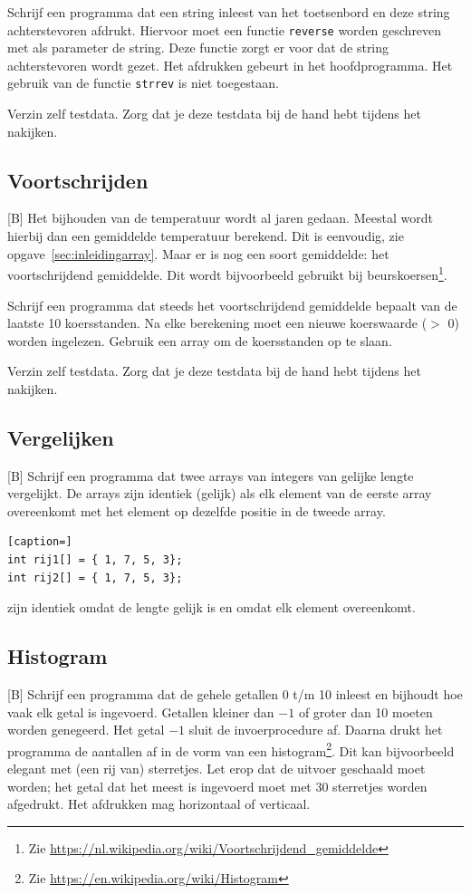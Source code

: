 \documentclass[a4paper,10pt,fleqn,twoside]{article}
\begin{document}
Schrijf een programma dat een string inleest van het toetsenbord en deze string achterstevoren afdrukt. Hiervoor moet een functie \lstinline|reverse| worden geschreven met als parameter de string. Deze functie zorgt er voor dat de string achterstevoren wordt gezet. Het afdrukken gebeurt in het hoofdprogramma. Het gebruik van de functie \lstinline|strrev| is niet toegestaan.

Verzin zelf testdata. Zorg dat je deze testdata bij de hand hebt tijdens het nakijken.

\subsection{Voortschrijden}[B]
Het bijhouden van de temperatuur wordt al jaren gedaan. Meestal wordt hierbij dan een gemiddelde temperatuur berekend. Dit is eenvoudig, zie opgave~\ref{sec:inleidingarray}. Maar er is nog een soort gemiddelde: het voortschrijdend gemiddelde. Dit wordt bijvoorbeeld gebruikt bij beurskoersen\footnote{Zie \url{https://nl.wikipedia.org/wiki/Voortschrijdend_gemiddelde}}.

Schrijf een programma dat steeds het voortschrijdend gemiddelde bepaalt van de laatste 10 koersstanden. Na elke berekening moet een nieuwe koerswaarde ($>$ 0) worden ingelezen. Gebruik een array om de koersstanden op te slaan.

Verzin zelf testdata. Zorg dat je deze testdata bij de hand hebt tijdens het nakijken.

\subsection{Vergelijken}[B]
Schrijf een programma dat twee arrays van integers van gelijke lengte vergelijkt. De arrays zijn identiek (gelijk) als elk element van de eerste array overeenkomt met het element op dezelfde positie in de tweede array.

\begin{lstlisting}[caption=]
int rij1[] = { 1, 7, 5, 3};
int rij2[] = { 1, 7, 5, 3};
\end{lstlisting}

zijn identiek omdat de lengte gelijk is en omdat elk element overeenkomt.

\subsection{Histogram}[B]
Schrijf een programma dat de gehele getallen 0 t/m 10 inleest en bijhoudt hoe vaak elk getal is ingevoerd. Getallen kleiner dan $-1$ of groter dan 10 moeten worden genegeerd. Het getal $-1$ sluit de invoerprocedure af. Daarna drukt het programma de aantallen af in de vorm van een histogram\footnote{Zie \url{https://en.wikipedia.org/wiki/Histogram}}. Dit kan bijvoorbeeld elegant met (een rij van) sterretjes. Let erop dat de uitvoer geschaald moet worden; het getal dat het meest is ingevoerd moet met 30 sterretjes worden afgedrukt. Het afdrukken mag horizontaal of verticaal.
\end{document}
